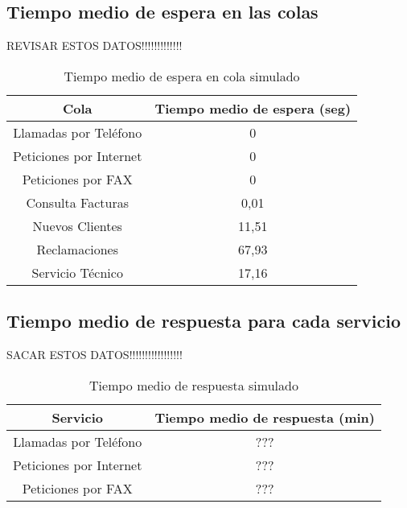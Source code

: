  \subsection{Tiempo medio de espera en las colas} 
 REVISAR ESTOS DATOS!!!!!!!!!!!!!
  \begin{table}[H]
    \begin{center}
    \begin{tabular}{|c|c|}
      \hline
      \textbf{Cola}       & \textbf{Tiempo medio de espera (seg)} \\ \hline
      Llamadas por Teléfono   & 0                   \\ \hline
      Peticiones por Internet & 0                  \\ \hline
      Peticiones por FAX      & 0                   \\ \hline
      Consulta Facturas      & 0,01                   \\ \hline
      Nuevos Clientes      & 11,51                   \\ \hline
      Reclamaciones      & 67,93                   \\ \hline
      Servicio Técnico      & 17,16                  \\ \hline
    \end{tabular}
  \end{center}
    \caption{Tiempo medio de espera en cola simulado}
    \end{table}
    
  \subsection{Tiempo medio de respuesta para cada servicio}  
  SACAR ESTOS DATOS!!!!!!!!!!!!!!!!!  
    \begin{table}[H]
      \begin{center}
      \begin{tabular}{|c|c|}
        \hline
        \textbf{Servicio}       & \textbf{Tiempo medio de respuesta (min)} \\ \hline
        Llamadas por Teléfono   & ???                   \\ \hline
        Peticiones por Internet & ???                 \\ \hline
        Peticiones por FAX      & ???                   \\ \hline
      \end{tabular}
    \end{center}
      \caption{Tiempo medio de respuesta simulado}
      \end{table}